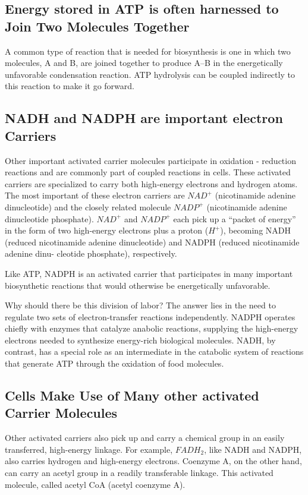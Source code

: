 \subsection{Energy stored in ATP is often harnessed to Join Two Molecules Together}

A common type of reaction that is needed for biosynthesis is one in which
two molecules, A and B, are joined together to produce A–B in the energetically
unfavorable condensation reaction. ATP hydrolysis can be coupled indirectly to this
reaction to make it go forward.

\subsection{NADH and NADPH are important electron Carriers}

Other important activated carrier molecules participate in oxidation -
reduction reactions and are commonly part of coupled reactions in cells.
These activated carriers are specialized to carry both high-energy electrons
and hydrogen atoms. The most important of these electron carriers
are $NAD^{+}$ (nicotinamide adenine dinucleotide) and the closely related
molecule $NADP^{+}$ (nicotinamide adenine dinucleotide phosphate).
$NAD^{+}$ and $NADP^{+}$ each pick up a “packet of energy” in the form of two high-energy
electrons plus a proton ($H^{+}$), becoming NADH (reduced nicotinamide
adenine dinucleotide) and NADPH (reduced nicotinamide adenine dinu-
cleotide phosphate), respectively.

Like ATP, NADPH is an activated carrier that participates in many
important biosynthetic reactions that would otherwise be energetically
unfavorable.

Why should there be this division of labor? The answer lies in the need
to regulate two sets of electron-transfer reactions independently. NADPH
operates chiefly with enzymes that catalyze anabolic reactions, supplying
the high-energy electrons needed to synthesize energy-rich biological
molecules. NADH, by contrast, has a special role as an intermediate in
the catabolic system of reactions that generate ATP through the oxidation
of food molecules.

\subsection{Cells Make Use of Many other activated Carrier Molecules}

Other activated carriers also pick up and carry a chemical group in an
easily transferred, high-energy linkage. For example, $FADH_{2}$,
like NADH and NADPH, also carries hydrogen and high-energy electrons.
Coenzyme A, on the other hand, can carry an acetyl
group in a readily transferable linkage. This activated molecule, called
acetyl CoA (acetyl coenzyme A).

